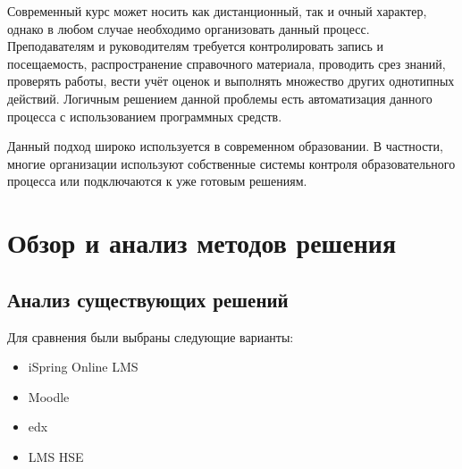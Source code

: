 \documentclass[a4paper,14pt]{article}
\begin{document}
Современный курс может носить как дистанционный, так и очный характер, однако в любом случае необходимо организовать данный процесс.
Преподавателям и руководителям требуется контролировать запись и посещаемость, распространение справочного материала, проводить срез знаний, проверять работы, вести учёт оценок и выполнять множество других однотипных действий.
Логичным решением данной проблемы есть автоматизация данного процесса с использованием программных средств.

Данный подход широко используется в современном образовании. В частности, многие организации используют собственные системы контроля образовательного процесса или подключаются к уже готовым решениям.








\section{Обзор и анализ методов решения}

\subsection{Анализ существующих решений}


Для сравнения были выбраны следующие варианты:

\begin{itemize}
	\item iSpring Online LMS
	\item Moodle	
	\item edx
	\item LMS HSE
	
\end{itemize}

\end{document}

